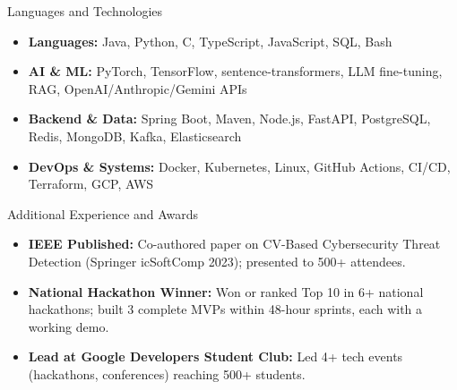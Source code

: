 \documentclass[]{mcdowellcv}
\begin{document}
\begin{cvsection}{Languages and Technologies}
  \begin{cvsubsection}{}{}{}
    \begin{itemize}
      \item \textbf{Languages:} Java, Python, C, TypeScript, JavaScript, SQL, Bash
      \item \textbf{AI \& ML:} PyTorch, TensorFlow, sentence-transformers, LLM fine-tuning, RAG, OpenAI/Anthropic/Gemini APIs
      \item \textbf{Backend \& Data:} Spring Boot, Maven, Node.js, FastAPI, PostgreSQL, Redis, MongoDB, Kafka, Elasticsearch
      \item \textbf{DevOps \& Systems:} Docker, Kubernetes, Linux, GitHub Actions, CI/CD, Terraform, GCP, AWS
    \end{itemize}
  \end{cvsubsection}
\end{cvsection}

\begin{cvsection}{Additional Experience and Awards}
  \begin{cvsubsection}{}{}{}
    \begin{itemize}
      \item \textbf{IEEE Published:} Co-authored paper on CV-Based Cybersecurity Threat Detection (Springer icSoftComp 2023); presented to 500+ attendees.
      \item \textbf{National Hackathon Winner:} Won or ranked Top 10 in 6+ national hackathons; built 3 complete MVPs within 48-hour sprints, each with a working demo.
      \item \textbf{Lead at Google Developers Student Club:} Led 4+ tech events (hackathons, conferences) reaching 500+ students.
    \end{itemize}
  \end{cvsubsection}
\end{cvsection}
\end{document}
